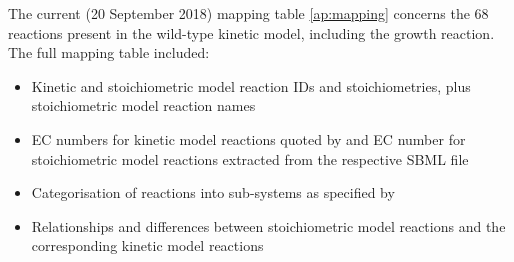 \documentclass[parskip=full, numbers=noenddot]{scrreprt}
\begin{document}
The current (20 September 2018) mapping table \ref{ap:mapping}
concerns the 68 reactions present in the wild-type kinetic model, including the growth reaction. The full mapping table included:
\begin{itemize}
\item Kinetic and stoichiometric model reaction IDs and stoichiometries, plus stoichiometric model reaction names
  \item EC numbers for kinetic model reactions quoted by \citet{millard_metabolic_2017} and EC number for stoichiometric model reactions extracted from the respective SBML file
\item Categorisation of reactions into sub-systems as specified by \citet{millard_metabolic_2017}
  \item Relationships and differences between stoichiometric model reactions and the corresponding kinetic model reactions
\end{itemize}



\end{document}
